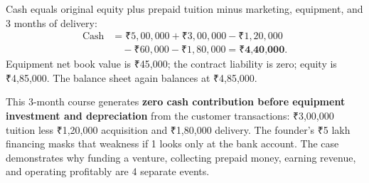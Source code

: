 Cash equals original equity plus prepaid tuition minus marketing, equipment, and 3 months of delivery:
\begin{equation}
\begin{aligned}
\text{Cash} &= ₹5,00,000 + ₹3,00,000 - ₹1,20,000 \\
&\quad - ₹60,000 - ₹1,80,000 = \textbf{₹4,40,000}.
\end{aligned}
\end{equation}
Equipment net book value is ₹45,000; the contract liability is zero; equity is ₹4,85,000. The balance sheet again balances at ₹4,85,000.

This 3-month course generates \textbf{zero cash contribution before equipment investment and depreciation} from the customer transactions: ₹3,00,000 tuition less ₹1,20,000 acquisition and ₹1,80,000 delivery. The founder's ₹5 lakh financing masks that weakness if 1 looks only at the bank account. The case demonstrates why funding a venture, collecting prepaid money, earning revenue, and operating profitably are 4 separate events.
